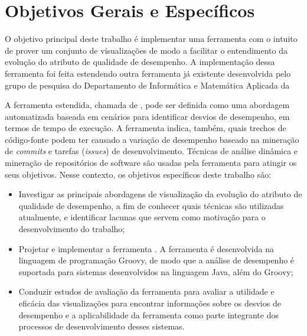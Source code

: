 \section{Objetivos Gerais e Específicos} \label{sec:objetivos-gerais-especificos}

O objetivo principal deste trabalho é implementar uma ferramenta com o intuito de prover um conjunto de visualizações de modo a facilitar o entendimento da evolução do atributo de qualidade de desempenho. A implementação dessa ferramenta foi feita estendendo outra ferramenta já existente desenvolvida pelo grupo de pesquisa do Departamento de Informática e Matemática Aplicada da 

A ferramenta estendida, chamada de \textit{\perfMinerName} \cite{Pinto2015}, pode ser definida como uma abordagem automatizada baseada em cenários para identificar desvios de desempenho, em termos de tempo de execução. A ferramenta indica, também, quais trechos de código-fonte podem ter causado a variação de desempenho baseado na mineração de \textit{commits} e tarefas (\textit{issues}) de desenvolvimento. Técnicas de análise dinâmica e mineração de repositórios de software são usadas pela ferramenta para atingir os seus objetivos. Nesse contexto, os objetivos específicos deste trabalho são:
\begin{itemize}
	\item Investigar as principais abordagens de visualização da evolução do atributo de qualidade de desempenho, a fim de conhecer quais técnicas são utilizadas atualmente, e identificar lacunas que servem como motivação para o desenvolvimento do trabalho;
	\item Projetar e implementar a ferramenta \textit{{\toolName}}. A ferramenta é desenvolvida na linguagem de programação Groovy, de modo que a análise de desempenho é suportada para sistemas desenvolvidos na linguagem Java, além do Groovy;
	\item Conduzir estudos de avaliação da ferramenta para avaliar a utilidade e eficácia das visualizações para encontrar informações sobre os desvios de desempenho e a aplicabilidade da ferramenta como parte integrante dos processos de desenvolvimento desses sistemas.
\end{itemize}

